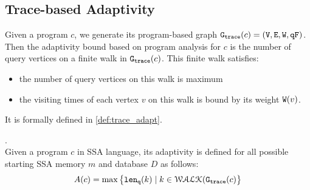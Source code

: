 %
\subsection{Trace-based Adaptivity}
Given a program $c$, we generate its program-based graph 
$\mathtt{{G_{trace}}}({c}) = (\mathtt{V}, \mathtt{E}, \mathtt{W}, \mathtt{qF})$.
%
Then the adaptivity bound based on program analysis for ${c}$ is the number of query vertices on a finite walk in $\mathtt{{G_{trace}}}({c})$. This finite walk satisfies:
%
\begin{itemize}
\item the number of query vertices on this walk is maximum
\item the visiting times of each vertex $v$ on this walk is bound by its weight $\mathtt{W}(v)$.
\end{itemize}
%
It is formally defined in \ref{def:trace_adapt}.
%
\begin{defn}
.
\label{def:trace_adapt}
\\
Given a program ${c}$ in SSA language, 
its adaptivity is defined for all possible starting SSA memory ${m}$ and database $D$ as follows:
%
$$
A(c) = \max \big 
\{ \mathtt{len}_{\tt q}(k) \mid k \in \mathcal{WALK}(\mathtt{{G_{trace}}}(c) \big \} 
$$
\end{defn}
%
%
%
%
%
%
%
%
% 
%
\clearpage